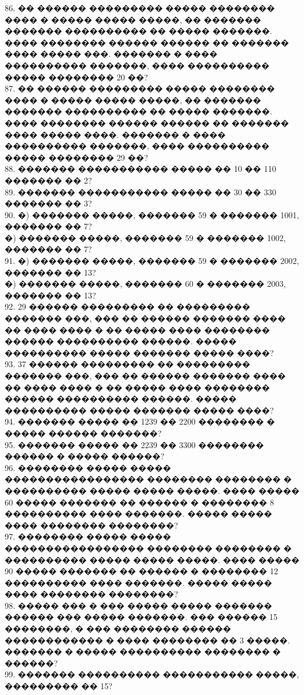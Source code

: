 \documentclass[12pt]{article}
\begin{document}
86. �� ������ ��������� ����� �������� ���� � ����� ����� �����, �� ������� ������� ���������� �� ����� �������. ���� �������� ������ ������ �� ������� ���� ����� ���. ������� � ���� ���������� �������, ���� ���������� ����� �������� 20 ��?\\
87. �� ������ ��������� ����� �������� ���� � ����� ����� �����, �� ������� ������� ���������� �� ����� �������. ���� �������� ������ ������ �� ������� ���� ����� ����. ������� � ���� ���������� �������, ���� ���������� ����� �������� 29 ��?\\
88. ������� ����������� ����� �� 10 �� 110 ������� �� 2?\\
89. ������� ����������� ����� �� 30 �� 330 ������� �� 3?\\
90. �) ������� �����, ������� 59 � ������� 1001, ������� �� 7?\\
�) ������� �����, ������� 59 � ������� 1002, ������� �� 7?\\
91. �) ������� �����, ������� 59 � ������� 2002, ������� �� 13?\\
�) ������� �����, ������� 60 � ������� 2003, ������� �� 13?\\
92. 29 ������ ��������� �� ��������� ������� ���, ��� �� ������ ������� ���� �� ���� ���� � �� ����� ���� �������� ������ ���������� ������. ����� ���������� ����� ������� ����� ����?\\
93. 37 ������ ��������� �� ��������� ������� ���, ��� �� ������ ������� ���� �� ���� ���� � �� ����� ���� �������� ������ ���������� ������. ����� ���������� ����� ������� ����� ����?\\
94. ������� ����� �� 1239 �� 2200 �������� � ����� ������ �������?\\
95. ������� ����� �� 2239 �� 3300 �������� ������ � ����� ������?\\
96. �������� ����� ����� ����������������� �������� �������� � ���������� ����� ����� �����. ���� ����� 60 ����� ������� �� ������ � �������� 8 ���������� ���� �������. ����� ����� ���� �������� ��������?\\
97. �������� ����� ����� ����������������� �������� �������� � ���������� ����� ����� �����. ���� ����� 90 ����� ������� �� ������ � �������� 12 ���������� ���� �������. ����� ����� ���� �������� ��������?\\
98. ����� ��� � ��� ����� ����� ������� ������ ��� ����� �������. ��� ������ 15 ��������, � ��� �������� ������ ������������ � ���� �������� �� 3 �����. ������� � ����� ���������� �������� � ������?\\
99. ������� ���������� ����������� �����, ��������� �� 15?\\
\end{document}
